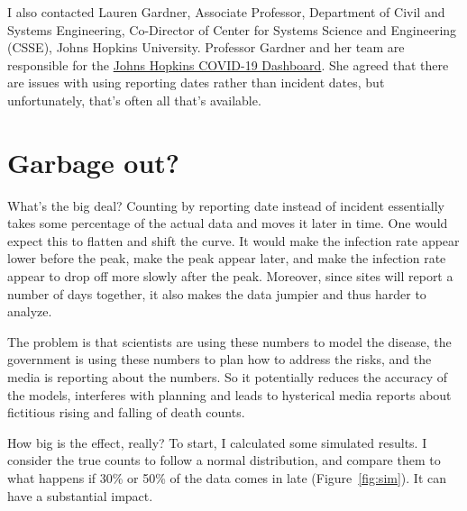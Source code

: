 \documentclass[10pt,reqno]{amsart}
\begin{document}



I also contacted Lauren Gardner, Associate Professor, Department of
Civil and Systems Engineering, Co-Director of Center for Systems
Science and Engineering (CSSE), Johns Hopkins University.  Professor
Gardner and her team are responsible for the
\href{https://coronavirus.jhu.edu/map.html}{Johns Hopkins COVID-19
  Dashboard}.  She agreed that there are issues with using reporting
dates rather than incident dates, but unfortunately, that's often all
that's available. \cite{Gardner2020Dates}


\section{Garbage out?}

What's the big deal?  Counting by reporting date instead of incident
essentially takes some percentage of the actual data and moves it
later in time.  One would expect this to flatten and shift the curve.
It would make the infection rate appear lower before the
peak, make the peak appear later, and make the infection rate appear
to drop off more slowly after the peak.  Moreover, since sites will
report a number of days together, it also makes the data jumpier and
thus harder to analyze.

The problem is that scientists are using these numbers to model the
disease, the government is using these numbers to plan how to address
the risks, and the media is reporting about the numbers.  So it
potentially reduces the accuracy of the models, interferes with
planning and leads to hysterical media reports about fictitious rising
and falling of death counts.

How big is the effect, really?  To start, I calculated some simulated
results.  I consider the true counts to follow a normal distribution,
and compare them to what happens if 30\% or 50\% of the data comes in
late (Figure~\ref{fig:sim}).  It can have a substantial impact.
\end{document}
